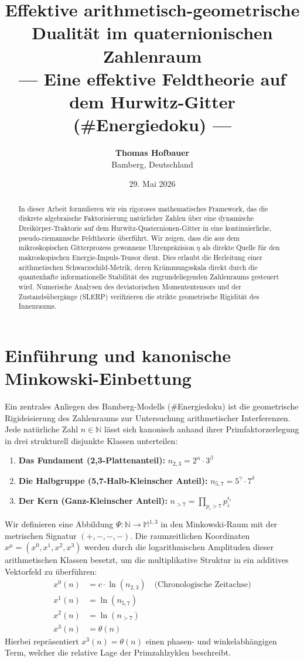 \documentclass[11pt,a4paper,nofootinbib]{article}
\title{\textbf{Effektive arithmetisch-geometrische Dualität im quaternionischen Zahlenraum}\\
	\large --- Eine effektive Feldtheorie auf dem Hurwitz-Gitter (\#Energiedoku) ---}
\author{\textbf{Thomas Hofbauer} \\
	\small Bamberg, Deutschland}
\date{\small 29. Mai 2026}
\begin{document}
	
	\maketitle
	
	\begin{abstract}
		In dieser Arbeit formulieren wir ein rigoroses mathematisches Framework, das die diskrete algebraische Faktorisierung natürlicher Zahlen über eine dynamische Dreikörper-Traktorie auf dem Hurwitz-Quaternionen-Gitter in eine kontinuierliche, pseudo-riemannsche Feldtheorie überführt. Wir zeigen, dass die aus dem mikroskopischen Gitterprozess gewonnene Uhrenpräzision $\eta$ als direkte Quelle für den makroskopischen Energie-Impuls-Tensor dient. Dies erlaubt die Herleitung einer arithmetischen Schwarzschild-Metrik, deren Krümmungsskala direkt durch die quantenhafte informationelle Stabilität des zugrundeliegenden Zahlenraums gesteuert wird. Numerische Analysen des deviatorischen Momententensors und der Zustandsübergänge (SLERP) verifizieren die strikte geometrische Rigidität des Innenraums.
	\end{abstract}
	
	\section{Einführung und kanonische Minkowski-Einbettung}
	Ein zentrales Anliegen des Bamberg-Modells (\#Energiedoku) ist die geometrische Rigideisierung des Zahlenraums zur Untersuchung arithmetischer Interferenzen. Jede natürliche Zahl $n \in \mathbb{N}$ lässt sich kanonisch anhand ihrer Primfaktorzerlegung in drei strukturell disjunkte Klassen unterteilen:
	\begin{enumerate}
		\item \textbf{Das Fundament (2,3-Plattenanteil):} $n_{2,3} = 2^{\alpha} \cdot 3^{\beta}$
		\item \textbf{Die Halbgruppe (5,7-Halb-Kleinscher Anteil):} $n_{5,7} = 5^{\gamma} \cdot 7^{\delta}$
		\item \textbf{Der Kern (Ganz-Kleinscher Anteil):} $n_{>7} = \prod_{p_i > 7} p_i^{\epsilon_i}$
	\end{enumerate}
	
	Wir definieren eine Abbildung $\Psi: \mathbb{N} \to \mathbb{M}^{1,3}$ in den Minkowski-Raum mit der metrischen Signatur $(+,-,-,-)$. Die raumzeitlichen Koordinaten $x^\mu = (x^0, x^1, x^2, x^3)$ werden durch die logarithmischen Amplituden dieser arithmetischen Klassen besetzt, um die multiplikative Struktur in ein additives Vektorfeld zu überführen:
	\begin{align}
		x^0(n) &= c \cdot \ln(n_{2,3}) \quad \text{(Chronologische Zeitachse)} \\
		x^1(n) &= \ln(n_{5,7}) \\
		x^2(n) &= \ln(n_{>7}) \\
		x^3(n) &= \theta(n)
	\end{align}
	Hierbei repräsentiert $x^3(n) = \theta(n)$ einen phasen- und winkelabhängigen Term, welcher die relative Lage der Primzahlzyklen beschreibt.
	
\end{document}
